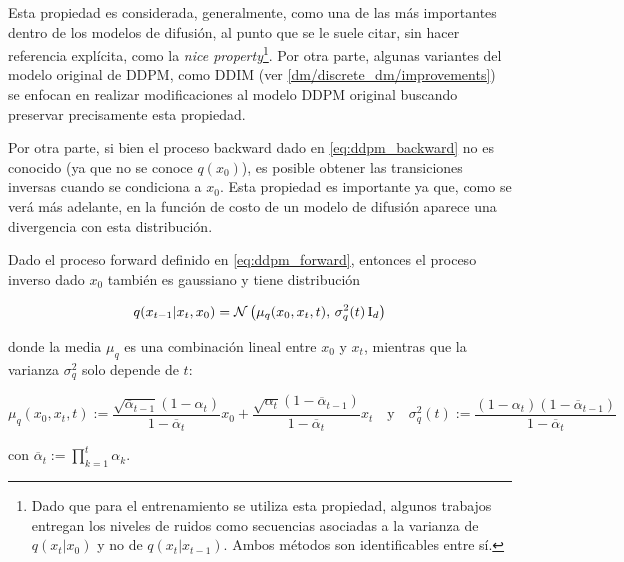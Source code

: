 Esta propiedad es considerada, generalmente, como una de las más importantes dentro de los modelos de difusión, al punto que se le suele citar, sin hacer referencia explícita, como la \textit{nice property}\footnote{Dado que para el entrenamiento se utiliza esta propiedad, algunos trabajos entregan los niveles de ruidos como secuencias asociadas a la varianza de $q(x_t|x_0)$ y no de $q(x_{t}|x_{t-1})$. Ambos métodos son identificables entre sí.}. Por otra parte, algunas variantes del modelo original de DDPM, como DDIM (ver \autoref{dm/discrete_dm/improvements}) se enfocan en realizar modificaciones al modelo DDPM original buscando preservar precisamente esta propiedad.

Por otra parte, si bien el proceso backward dado en \eqref{eq:ddpm_backward} no es conocido (ya que no se conoce $q(x_0)$), es posible obtener las transiciones inversas cuando se condiciona a $x_0$. Esta propiedad es importante ya que, como se verá más adelante, en la función de costo de un modelo de difusión aparece una divergencia con esta distribución.

\begin{prop}
    \label{prop:conditional_backward}
    Dado el proceso forward definido en \eqref{eq:ddpm_forward}, entonces el proceso inverso dado $x_0$ también es gaussiano y tiene distribución

    \begin{equation}
        \label{eq:conditional_backward}
        q(x_{t-1}|x_t,x_0) = \mathcal{N}\left(\mu_q(x_0,x_t,t),\,\sigma_q^2(t)\operatorname{I}_{d}\right)
    \end{equation}

    donde la media $\mu_q$ es una combinación lineal entre $x_0$ y $x_t$, mientras que la varianza $\sigma_q^2$ solo depende de $t$:

    \begin{equation}
        \label{eq:conditional_backward_params}
        \mu_q(x_0,x_t, t) := \frac{\sqrt{\overline{\alpha}_{t-1}}(1-\alpha_t)}{1-\overline{\alpha}_t}x_0 + \frac{\sqrt{\alpha_t}(1-\overline{\alpha}_{t-1})}{1-\overline{\alpha}_t}x_t
        \quad\text{y}\quad
        \sigma_q^2(t) := \frac{(1-\alpha_t)(1-\overline{\alpha}_{t-1})}{1-\overline{\alpha}_t}
    \end{equation}

    con $\overline{\alpha}_t := \prod\limits_{k=1}^t \alpha_k$.
\end{prop}


